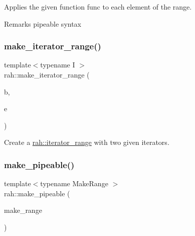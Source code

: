 Applies the given function func to each element of the range. 

\begin{DoxyRemark}{Remarks}
pipeable syntax
\end{DoxyRemark}

\begin{DoxyCodeInclude}{0}
\end{DoxyCodeInclude}
\mbox{\label{namespacerah_a4e145bfeb8a932058e20fc4cb4e7c206}} 
\subsubsection{\texorpdfstring{make\_iterator\_range()}{make\_iterator\_range()}}
{\footnotesize\ttfamily template$<$typename I $>$ \\
rah\+::make\+\_\+iterator\+\_\+range (\begin{DoxyParamCaption}\item[{I}]{b,  }\item[{I}]{e }\end{DoxyParamCaption})}



Create a \mbox{\hyperlink{structrah_1_1iterator__range}{rah\+::iterator\+\_\+range}} with two given iterators. 

\mbox{\label{namespacerah_a274b78c4c0af5dd58ce280f02223fb55}} 
\subsubsection{\texorpdfstring{make\_pipeable()}{make\_pipeable()}}
{\footnotesize\ttfamily template$<$typename Make\+Range $>$ \\
rah\+::make\+\_\+pipeable (\begin{DoxyParamCaption}\item[{Make\+Range \&\&}]{make\+\_\+range }\end{DoxyParamCaption})}




